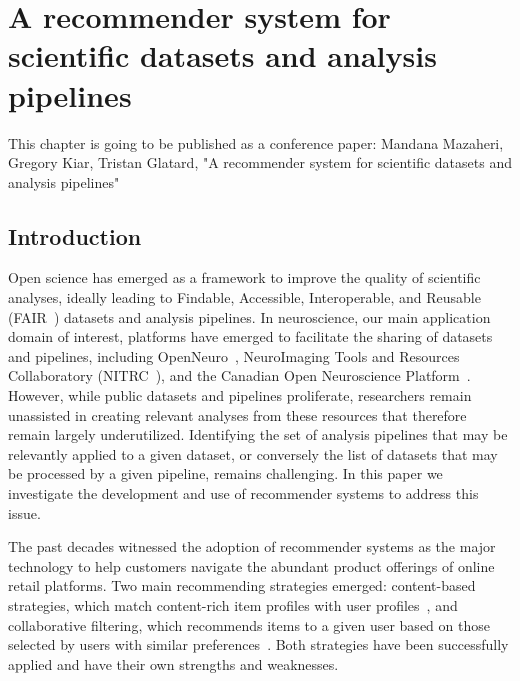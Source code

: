 \chapter{A recommender system for scientific datasets and analysis pipelines}
\label{pipeline-dataset-recommender}

This chapter is going to be published as a conference paper: Mandana Mazaheri, Gregory Kiar, Tristan Glatard, "A recommender system for scientific datasets and analysis pipelines" \

\section{Introduction}

Open science has emerged as a framework to improve the quality of
scientific analyses, ideally leading to Findable, Accessible, Interoperable, and
Reusable (FAIR~\cite{wilkinson2016fair}) datasets and analysis pipelines. In
neuroscience, our main application domain of interest, platforms have
emerged to facilitate the sharing of datasets and pipelines, including
OpenNeuro~\cite{gorgolewski2017openneuro}, NeuroImaging Tools and Resources Collaboratory (NITRC~\cite{kennedy2016nitrc}), and the Canadian Open
Neuroscience Platform~\cite{Jean-Baptiste2020}. However, while public
datasets and pipelines proliferate, researchers remain unassisted in
creating relevant analyses from these resources that therefore remain
largely underutilized. Identifying the set of analysis pipelines that may
be relevantly applied to a given dataset, or conversely the list of datasets that may be processed by
a given pipeline, remains challenging. In this paper we investigate
the development and use of recommender systems to address this issue.


The past decades witnessed the adoption of recommender systems as the major
 technology to help customers navigate the abundant product offerings of
 online retail platforms. Two main
 recommending strategies emerged: content-based strategies, which match content-rich item profiles with user profiles~\cite{pazzani2007content},
 and collaborative filtering, which recommends items to a given user based on those
 selected by users with similar preferences~\cite{rajaraman2011mining}.
 Both strategies have been successfully applied and have their own strengths and weaknesses.
 
